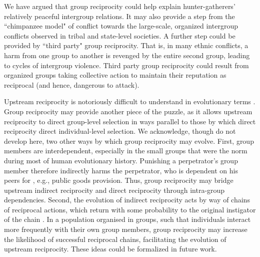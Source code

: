 \documentclass[12pt,a4paper]{article}\usepackage[]{graphicx}\usepackage[]{color}
\makeatletter
\renewcommand\section{\@startsection {section}{1}{\z@}%
{-3.5ex \@plus -1ex \@minus -.2ex}%
{2.3ex \@plus.2ex}%
{\bf\sffamily\Large}}
\makeatother
\begin{document}
We have argued that group reciprocity could help explain hunter-gatherers' relatively peaceful intergroup relations. It may
also provide a step from the ``chimpanzee model" of conflict towards the large-scale, organized intergroup conflicts
observed in tribal and state-level societies. A further step could be provided by ``third party" group reciprocity. That 
is, in many ethnic conflicts, a harm from one group to another is revenged by the entire second group, leading to 
cycles of intergroup violence. Third party group reciprocity could result from organized groups taking collective
action to maintain their reputation as reciprocal (and hence, dangerous to attack).

Upstream reciprocity is notoriously difficult to understand in evolutionary
terms \citep{boyd1989evolution,nowak2007upstream}. Group reciprocity
may provide another piece of the puzzle, as it allows upstream reciprocity to direct group-level selection in ways parallel 
to those by which direct reciprocity direct individual-level selection.
We acknowledge, though do not develop here, two other ways by which group reciprocity may evolve.
First, group members are interdependent, especially in the small groups that were the norm during most of human evolutionary 
history. Punishing a perpetrator's group member therefore indirectly harms the perpetrator, who is dependent on his peers for
, e.g., public goods provision. Thus, group reciprocity may bridge upstream indirect reciprocity and direct reciprocity 
through intra-group dependencies. Second, the evolution of indirect reciprocity acts by way of chains
of reciprocal actions, which return with some probability to the original
instigator of the chain \citep{nowak2007upstream}. In a population
organised in groups, such that individuals interact more frequently with
their own group members, group reciprocity may increase the likelihood
of successful reciprocal chains, facilitating the evolution of upstream
reciprocity. These ideas could be formalized in future work.



\newpage
\printbibliography
%
%
\end{document}
